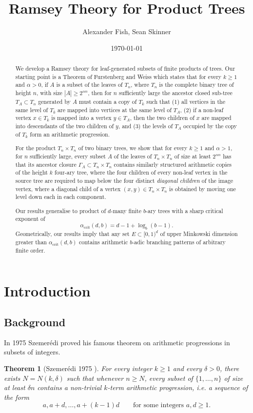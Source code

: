 \documentclass[11pt]{amsart}
\title{Ramsey Theory for Product Trees}
\author{Alexander Fish, Sean Skinner}
\date{\today}                                           %
\newcommand\labs[1]{\left\lvert#1\right\rvert}
\renewcommand{\geq}{\geqslant}
\theoremstyle{plain}
\newtheorem{thm}{Theorem}[section]
\theoremstyle{definition}
\theoremstyle{remark}
\begin{document}
\maketitle

\begin{abstract}
We develop a Ramsey theory for leaf-generated subsets of finite products of trees. Our starting point is a Theorem of Furstenberg and Weiss which states that for every $k\geq 1$ and $\alpha>0$, if $A$ is a subset of the leaves of $T_n$, where $T_n$ is the complete binary tree of height $n$, with size $\labs{A}\geq 2^{\alpha n}$, then for $n$ sufficiently large the ancestor closed sub-tree $T_A\subset T_n$ generated by $A$ must contain a copy of $T_k$ such that (1) all vertices in the same level of $T_k$ are mapped into vertices at the same level of $T_A$, (2) if a non-leaf vertex $x\in T_k$ is mapped into a vertex $y \in T_A$, then the two children of $x$ are mapped into descendants of the two children of $y$, and (3) the levels of $T_A$ occupied by the copy of $T_k$ form an arithmetic progression.

For the product $T_n \times T_n$ of two binary trees, we show that for every $k\geq 1$ and $\alpha > 1$, for $n$ sufficiently large, every subset $A$ of the leaves of $T_n\times T_n$ of size at least $2^{\alpha n}$ has that its ancestor closure $\Gamma_A\subset T_n \times T_n$ contains similarly structured arithmetic copies of the height $k$ four-ary tree, where the four children of every non-leaf vertex in the source tree are required to map below the four distinct \textit{diagonal children} of the image vertex, where a diagonal child of a vertex $(x,y) \in T_n \times T_n$ is obtained by moving one level down each in each component.

Our results generalise to product of $d$-many finite $b$-ary trees with a sharp critical exponent of 
\[ \alpha_{\text{crit}}(d,b) =d-1 + \log_b(b-1).\]
Geometrically, our results imply that any set $E\subset [0,1)^d$ of upper Minkowski dimension greater than $\alpha_{\text{crit}}(d,b)$ contains arithmetic $b$-adic branching patterns of arbitrary finite order.
\end{abstract}
\section{Introduction}
\subsection{Background}
In 1975 Szemer\'{e}di proved his famous theorem on arithmetic progressions in subsets of integers.
\begin{thm}[Szemer\'{e}di 1975 \cite{Sz}]\label{Th: Szm}
For every integer $k\geq 1$ and every $\delta>0$, there exists $N=N(k,\delta)$ such that whenever $n\geq N$, every subset of $\{1,\ldots,n\}$ of size at least $\delta n$ contains a non-trivial $k$-term arithmetic progression, i.e. a sequence of the form
\[a,a+d,\ldots,a+(k-1)d
\qquad\text{for some integers }a,d\geq1.
\]
\end{thm}
\end{document}
